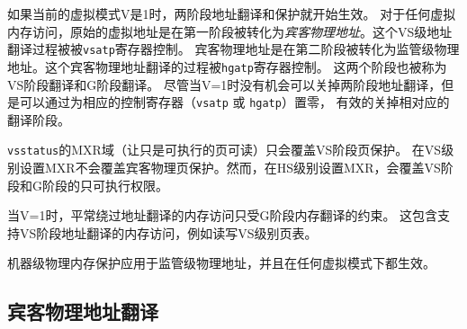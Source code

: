如果当前的虚拟模式V是1时，两阶段地址翻译和保护就开始生效。
对于任何虚拟内存访问，原始的虚拟地址是在第一阶段被转化为{\em 宾客物理地址}。这个VS级地址翻译过程被被{\tt vsatp}寄存器控制。
宾客物理地址是在第二阶段被转化为监管级物理地址。这个宾客物理地址翻译的过程被{\tt hgatp}寄存器控制。
这两个阶段也被称为VS阶段翻译和G阶段翻译。
尽管当V=1时没有机会可以关掉两阶段地址翻译，但是可以通过为相应的控制寄存器（{\tt vsatp} 或 {\tt hgatp}）置零，
有效的关掉相对应的翻译阶段。

{\tt vsstatus}的MXR域（让只是可执行的页可读）只会覆盖VS阶段页保护。
在VS级别设置MXR不会覆盖宾客物理页保护。然而，在HS级别设置MXR，会覆盖VS阶段和G阶段的只可执行权限。

当V=1时，平常绕过地址翻译的内存访问只受G阶段内存翻译的约束。
这包含支持VS阶段地址翻译的内存访问，例如读写VS级别页表。

机器级物理内存保护应用于监管级物理地址，并且在任何虚拟模式下都生效。

\subsection{宾客物理地址翻译}
\label{sec:guest-addr-translation}

